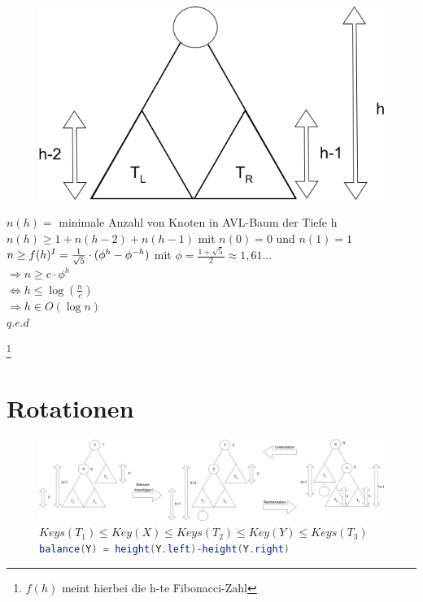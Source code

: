 \begin{minipage}[t]{0.4\textwidth}
\begin{figure}[H]
\includegraphics[width=\textwidth,left]{11/Grafik/img2.png}\\
\end{figure}%

\end{minipage}
\hspace{5mm}
\begin{minipage}[t]{0.55\textwidth}
$n(h) =$ minimale Anzahl von Knoten in AVL-Baum der Tiefe h\\

$n(h) \geq 1+n(h-2) + n(h-1)$ mit  $n(0)=0$ und $n(1)=1$\\

$n \geq f(h)^{\RM{1}} = \frac{1}{\sqrt{5}} \cdot (\phi^h-\phi^{-h})$ mit $\phi = \frac{1+\sqrt{5}}{2} \approx 1,61...$\\
$\Rightarrow n \geq c \cdot \phi^h$\\
$\Leftrightarrow h \leq \log{(\frac{n}{c})}$\\

$\Rightarrow h \in O(\log{n})$\\

$q.e.d$
\end{minipage}


\footnote[1]{$f(h)$ meint hierbei die h-te Fibonacci-Zahl} 

\pagebreak



\section{Rotationen}

\begin{figure}[H]
\includegraphics[width=\textwidth,left]{11/Grafik/img3_Rotation.png}\\

$Keys(T_1) \le Key(X) \le Keys(T_2) \le Key(Y) \le Keys(T_3)$ \\
\lstinline[language=Java]{balance(Y) = height(Y.left)-height(Y.right)}
\end{figure}



